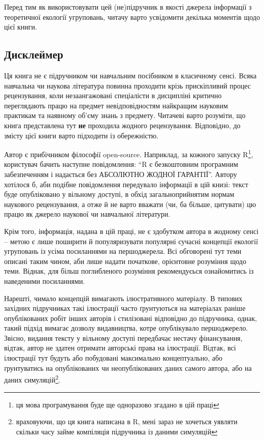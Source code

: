 \documentclass[
  11pt,
]{book}
\begin{document}
Перед тим як використовувати цей (не)підручник в якості джерела інформації з теоретичної екології угруповань, читачу варто усвідомити декілька моментів щодо цієї книги.

\subsection{Дисклеймер}\label{readme}

Ця книга не є підручником чи навчальним посібником в класичному сенсі. Всяка навчальна чи наукова література повинна проходити крізь прискіпливий процес рецензування, коли незаангажовані спеціалісти в дисципліні критично переглядають працю на предмет невідповідностям найкращим науковим практикам та наявному об'єму знань з предмету. Читачеві варто розуміти, що книга представлена тут \textbf{не} проходила жодного рецензування. Відповідно, до змісту цієї книги варто підходити із обережністю.

Автор є прибічником філософії open-source. Наприклад, за кожного запуску R\footnote{ця мова програмування буде ще одноразово згадано в цій праці}, користувач бачить наступне повідомлення: ``R є безкоштовним програмним забезпеченням і надається без АБСОЛЮТНО ЖОДНОЇ ГАРАНТІЇ''. Автору хотілося б, аби подібне повідомлення передувало інформації в цій книзі: текст буде опубліковано у вільному доступі, в обхід загальноприйнятим нормам наукового рецензування, а отже й не варто вважати (чи, ба більше, цитувати) цю працю як джерело наукової чи навчальної літератури.

Крім того, інформація, надана в цій праці, не є здобутком автора в жодному сенсі -- метою є лише поширити й популяризувати популярні сучасні концепції екології угруповань із усіма посиланнями на першоджерела. Всі обговорені тут теми описані таким чином, аби лише надати початкове, орієнтовне розуміння щодо теми. Віднак, для більш поглибленого розуміння рекомендуєься ознайомитись із наведеними посиланнями.

Нарешті, чимало концепцій вимагають ілюстративного матеріалу. В типових західних підручниках такі ілюстрації часто ґрунтуються на матеріалах раніше опублікованих робіт інших авторів і стилізовані відповідно до підручника, однак, такий підхід вимагає дозволу видавництва, котре опублікувало першоджерело. Звісно, видання тексту у вільному доступі передбачає нестачу фінансування, відтак, автор не здатен отримати авторські права на ілюстрації. Відтак, всі ілюстрації тут будуть або побудовані максимально концептуально, або ґрунтуватись на опублікованих чи неопублікованих даних самого автора, або на даних симуляцій\footnote{враховуючи, що ця книга написана в R, мені зараз не хочеться уявляти скільки часу займе компіляція підручника із даними симуляцій}.
\end{document}
